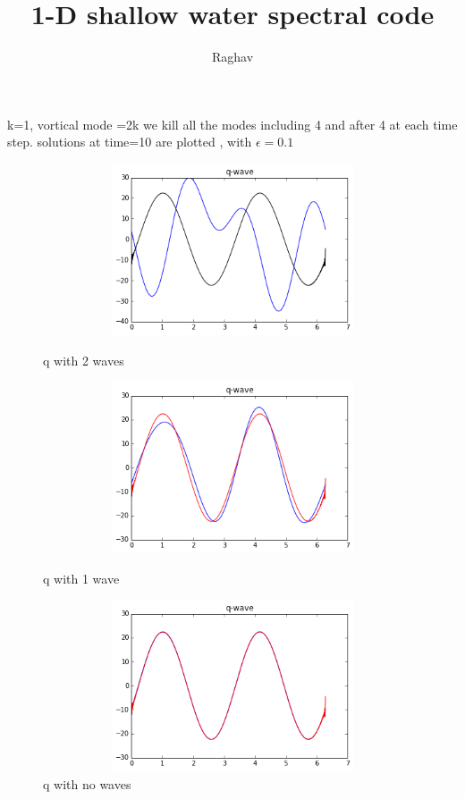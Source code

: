 \documentclass[12pt,twoside]{article}
\title{1-D shallow water spectral code}
\author{Raghav}
\begin{document}
\maketitle

k=1, vortical mode =2k
we kill all the modes including 4 and after 4 at each time step. solutions at time=10 are plotted , with $\epsilon=0.1$


\begin{figure}
\centering
\includegraphics[width=5in,height=2in]{q-wave.png}
\caption{q with 2 waves}


\includegraphics[width=5in,height=2in]{q1wave.png}
\caption{q with 1 wave}

\includegraphics[width=5in,height=2in]{q-nowave.png}
\caption{q with no waves}



\end{figure}
\end{document}
